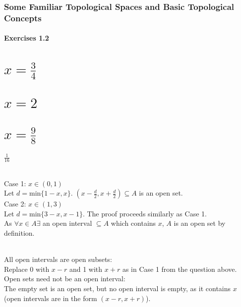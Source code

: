 \section{Some Familiar Topological Spaces and Basic Topological Concepts}

\subsection{Exercises 1.2}



\begin{parts}
 
 \part{$x = \frac{3}{4}$}
 \part{$x = 2$}
 \part{$x = \frac{9}{8}$}
 
\begin{solution}
 $\frac{1}{16}$
\end{solution}

\end{parts}


\begin{solution}
\\Case 1: $x \in (0,1)$ \\
Let $d = \text{min}\{1-x,x\}$. $(x-\frac{d}{2},x+\frac{d}{2}) \subseteq A$ is an open set. \\
Case 2: $x \in (1,3)$ \\
Let $d = \text{min}\{3-x,x-1\}$. The proof proceeds similarly as Case 1. \\
As $\forall x \in A \exists$ an open interval $\subseteq A$ which contains $x$, $A$ is an open set by definition.
\end{solution}


\begin{solution}
 \\All open intervals are open subsets: \\
 Replace 0 with $x-r$ and 1 with $x+r$ as in Case 1 from the question above. \\
 Open sets need not be an open interval: \\
 The empty set is an open set, but no open interval is empty, as it contains $x$ (open intervals are in the form $(x-r,x+r)$).
\end{solution}

